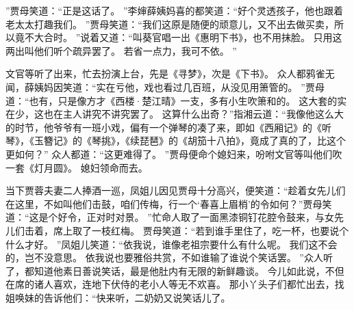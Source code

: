 ”贾母笑道：“正是这话了。
”李婶薛姨妈喜的都笑道：“好个灵透孩子，他也跟着老太太打趣我们。
”贾母笑道：“我们这原是随便的顽意儿，又不出去做买卖，所以竟不大合时。
”说着又道：“叫葵官唱一出《惠明下书》，也不用抹脸。
只用这两出叫他们听个疏异罢了。
若省一点力，我可不依。
”\par
文官等听了出来，忙去扮演上台，先是《寻梦》，次是《下书》。
众人都鸦雀无闻，薛姨妈因笑道：“实在亏他，戏也看过几百班，从没见用箫管的。
”贾母道：“也有，只是像方才《西楼·楚江晴》一支，多有小生吹箫和的。
这大套的实在少，这也在主人讲究不讲究罢了。
这算什么出奇？”指湘云道：“我像他这么大的时节，他爷爷有一班小戏，偏有一个弹琴的凑了来，即如《西厢记》的《听琴》，《玉簪记》的《琴挑》，《续琵琶》的《胡笳十八拍》，竟成了真的了，比这个更如何？”
众人都道：“这更难得了。
”贾母便命个媳妇来，吩咐文官等叫他们吹一套《灯月圆》。
媳妇领命而去。
\par
当下贾蓉夫妻二人捧酒一巡，凤姐儿因见贾母十分高兴，便笑道：“趁着女先儿们在这里，不如叫他们击鼓，咱们传梅，行一个‘春喜上眉梢’的令如何？”贾母笑道：“这是个好令，正对时对景。
”忙命人取了一面黑漆铜钉花腔令鼓来，与女先儿们击着，席上取了一枝红梅。
贾母笑道：“若到谁手里住了，吃一杯，也要说个什么才好。
”凤姐儿笑道：“依我说，谁像老祖宗要什么有什么呢。
我们这不会的，岂不没意思。
依我说也要雅俗共赏，不如谁输了谁说个笑话罢。
”众人听了，都知道他素日善说笑话，最是他肚内有无限的新鲜趣谈。
今儿如此说，不但在席的诸人喜欢，连地下伏侍的老小人等无不欢喜。
那小丫头子们都忙出去，找姐唤妹的告诉他们：“快来听，二奶奶又说笑话儿了。
